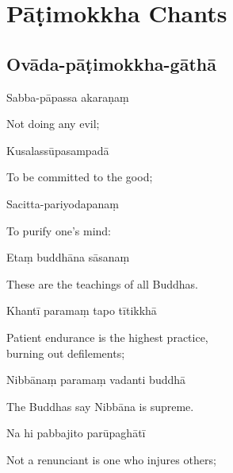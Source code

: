 \chapter{Pāṭimokkha Chants}

\section{Ovāda-pāṭimokkha-gāthā}


\begin{leader}
\end{leader}


Sabba-pāpassa akaraṇaṃ

\begin{english}
  Not doing any evil;
\end{english}

Kusalassūpasampadā

\begin{english}
  To be committed to the good;
\end{english}

Sacitta-pariyodapanaṃ

\begin{english}
  To purify one's mind:
\end{english}

Etaṃ buddhāna sāsanaṃ

\begin{english}
  These are the teachings of all Buddhas.
\end{english}

Khantī paramaṃ tapo tītikkhā

\begin{english}
  Patient endurance is the highest practice,\\
  burning out defilements;\\
\end{english}

Nibbānaṃ paramaṃ vadanti buddhā

\begin{english}
  The Buddhas say Nibbāna is supreme.
\end{english}

Na hi pabbajito parūpaghātī

\begin{english}
  Not a renunciant is one who injures others;
\end{english}

